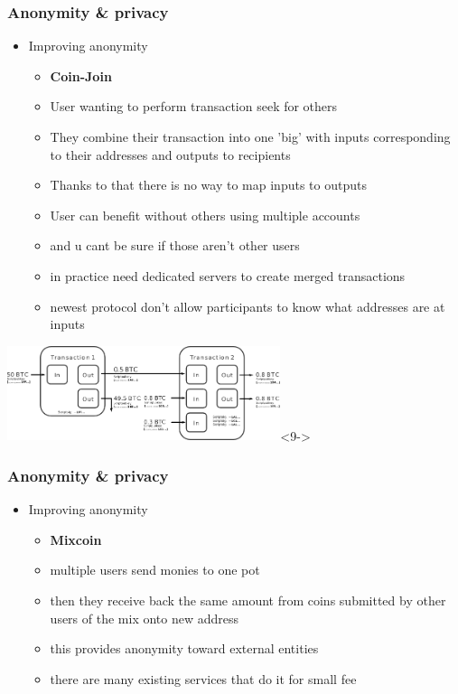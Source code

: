 \documentclass{beamer}
\begin{document}
\begin{frame}
    \frametitle{Anonymity \& privacy}
    \begin{itemize}
        \item<1-> Improving anonymity
        \begin{itemize}
            \item<2-> \textbf{Coin-Join}
            \item<3-> User wanting to perform transaction seek for others
            \item<4-> They combine their transaction into one 'big' with inputs corresponding to their addresses
                        and outputs to recipients
            \item<5-> Thanks to that there is no way to map inputs to outputs
            \item<6-> User can benefit without others using multiple accounts
            \item<7-> and u cant be sure if those aren't other users
            \item<8-> in practice need dedicated servers to create merged transactions 
            \item<9-> newest protocol don't allow participants to know what addresses are at inputs
        \end{itemize}   
    \end{itemize}
    \begin{center}
    \includegraphics[width=80mm]{coin-join.png}<9->   
    \end{center} 
\end{frame}

\begin{frame}
    \frametitle{Anonymity \& privacy}
    \begin{itemize}
        \item<1-> Improving anonymity
        \begin{itemize}
            \item<2-> \textbf{Mixcoin}
            \item<3-> multiple users send monies to one pot
            \item<4-> then they receive back the same amount from coins submitted by other users of the mix onto new address
            \item<5-> this provides anonymity toward external entities
            \item<6-> there are many existing services that do it for small fee 
        \end{itemize}   
    \end{itemize}
\end{frame}
\end{document}
